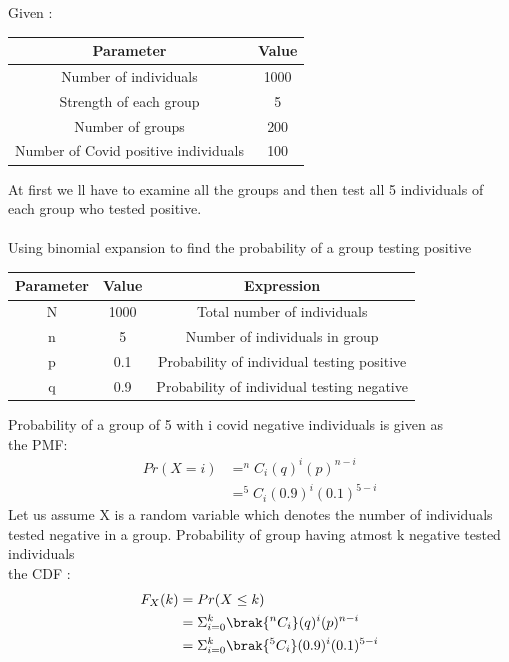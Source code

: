 \documentclass[journal,12pt,onecolumn]{IEEEtran}
\begin{document}
Given : \\
\begin{table}[H]
\def\arraystretch{1.2}
\begin{tabular}{|c|c|}
\hline
	\textbf{Parameter} &\textbf{Value} \\ \hline
	Number of individuals &1000 \\ \hline
	Strength of each group &5 \\ 
	\hline
	Number of groups &200 \\ 
	\hline
	Number of Covid positive individuals &100 \\ \hline
	
	
\end{tabular}
\end{table}
At first we ll have to examine all the groups and then test all 5 individuals of each group who tested positive.\\ \\
Using binomial expansion to find the probability of a group testing positive \\
\begin{table}[H]
\def\arraystretch{1.2}
\begin{tabular}{|c|c|c|}
\hline
	\textbf{Parameter} &\textbf{Value} &\textbf{Expression} \\ \hline
	N &1000 &Total number of individuals \\ \hline
	n &5 &Number of individuals in group \\ \hline
	p &0.1 &Probability of individual testing positive \\ \hline
	q &0.9 &Probability of individual testing negative \\ \hline	
\end{tabular}
\end{table}
Probability of a group of 5 with i covid negative individuals is given as \\
the PMF:
\begin{align}
Pr(X=i) &= ^{n}C_{i}(q)^{i}(p)^{n-i} \\
&= ^{5}C_{i}(0.9)^{i}(0.1)^{5-i}
\end{align}
Let us assume X is a random variable which denotes the number of individuals tested negative in a group.
Probability of group having atmost k negative tested individuals \\
the CDF :
\begin{align}
F_{X}(k) &= Pr(X \le k) \\
&= \Sigma_{i=0}^k \brak{^{n}C_{i}}(q)^{i}(p)^{n-i} \\
&= \Sigma_{i=0}^k \brak{^{5}C_{i}}(0.9)^{i}(0.1)^{5-i} \\
\end{align}
\end{document}
